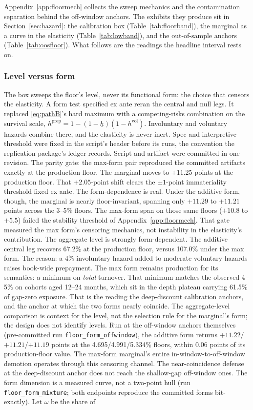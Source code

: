 \documentclass[12pt]{article}
\begin{document}
Appendix~\ref{app:floormech} collects the sweep mechanics and the contamination separation behind the off-window anchors. The exhibits they produce sit in Section~\ref{sec:hazard}: the calibration box (Table~\ref{tab:floorband}), the marginal as a curve in the elasticity (Table~\ref{tab:lowband}), and the out-of-sample anchors (Table~\ref{tab:oosfloor}). What follows are the readings the headline interval rests on.

\subsubsection{Level versus form}

The box sweeps the floor's level, never its functional form: the choice that censors the elasticity. A form test specified ex ante reran the central and null legs. It replaced \eqref{eq:pathB}'s hard maximum with a competing-risks combination on the survival scale, $h^{\mathrm{prep}} = 1 - (1 - \underline{h})(1 - h^{\mathrm{vol}})$. Involuntary and voluntary hazards combine there, and the elasticity is never inert. Spec and interpretive threshold were fixed in the script's header before its runs, the convention the replication package's ledger records. Script and artifact were committed in one revision. The parity gate: the max-form pair reproduced the committed artifacts exactly at the production floor. The marginal moves to $+11.25$ points at the production floor. That $+2.05$-point shift clears the $\pm 1$-point immateriality threshold fixed ex ante. The form-dependence is real. Under the additive form, though, the marginal is nearly floor-invariant, spanning only $+11.29$ to $+11.21$ points across the 3--5\% floors. The max-form span on those same floors ($+10.8$ to $+5.5$) failed the stability threshold of Appendix~\ref{app:floormech}. That gate measured the max form's censoring mechanics, not instability in the elasticity's contribution. The aggregate level is strongly form-dependent. The additive central leg recovers 67.2\% at the production floor, versus 107.0\% under the max form. The reason: a 4\% involuntary hazard added to moderate voluntary hazards raises book-wide prepayment. The max form remains production for its semantics: a minimum on \emph{total} turnover. That minimum matches the observed 4--5\% on cohorts aged 12--24 months, which sit in the depth plateau carrying 61.5\% of gap-zero exposure. That is the reading the deep-discount calibration anchors, and the anchor at which the two forms nearly coincide. The aggregate-level comparison is context for the level, not the selection rule for the marginal's form; the design does not identify levels. Run at the off-window anchors themselves (pre-committed run \texttt{floor\_form\_offwindow}), the additive form returns $+11.22$/$+11.21$/$+11.19$ points at the 4.695/4.991/5.334\% floors, within 0.06 points of its production-floor value. The max-form marginal's entire in-window-to-off-window demotion operates through this censoring channel. The near-coincidence defense at the deep-discount anchor does not reach the shallow-gap off-window ones. The form dimension is a measured curve, not a two-point hull (run \texttt{floor\_form\_mixture}; both endpoints reproduce the committed forms bit-exactly). Let $\omega$ be the share of 
\end{document}
